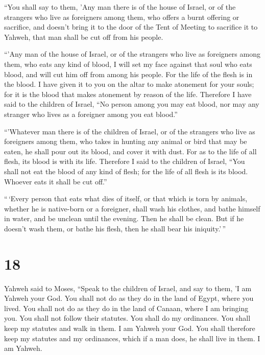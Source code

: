  ``You shall say to them, 'Any man there is of the house
of Israel, or of the strangers who live as foreigners among them, who
offers a burnt offering or sacrifice,  and doesn't bring
it to the door of the Tent of Meeting to sacrifice it to Yahweh, that
man shall be cut off from his people.

 ``'Any man of the house of Israel, or of the strangers
who live as foreigners among them, who eats any kind of blood, I will
set my face against that soul who eats blood, and will cut him off from
among his people.  For the life of the flesh is in the
blood. I have given it to you on the altar to make atonement for your
souls; for it is the blood that makes atonement by reason of the life.
 Therefore I have said to the children of Israel, ``No
person among you may eat blood, nor may any stranger who lives as a
foreigner among you eat blood.''

 ``'Whatever man there is of the children of Israel, or
of the strangers who live as foreigners among them, who takes in hunting
any animal or bird that may be eaten, he shall pour out its blood, and
cover it with dust.  For as to the life of all flesh, its
blood is with its life. Therefore I said to the children of Israel,
``You shall not eat the blood of any kind of flesh; for the life of all
flesh is its blood. Whoever eats it shall be cut off.''

 ``\,`Every person that eats what dies of itself, or that
which is torn by animals, whether he is native-born or a foreigner,
shall wash his clothes, and bathe himself in water, and be unclean until
the evening. Then he shall be clean.  But if he doesn't
wash them, or bathe his flesh, then he shall bear his iniquity.'\,''

\hypertarget{section-17}{%
\section{18}\label{section-17}}

 Yahweh said to Moses,  ``Speak to the
children of Israel, and say to them, 'I am Yahweh your God.
 You shall not do as they do in the land of Egypt, where
you lived. You shall not do as they do in the land of Canaan, where I am
bringing you. You shall not follow their statutes.  You
shall do my ordinances. You shall keep my statutes and walk in them. I
am Yahweh your God.  You shall therefore keep my statutes
and my ordinances, which if a man does, he shall live in them. I am
Yahweh.

